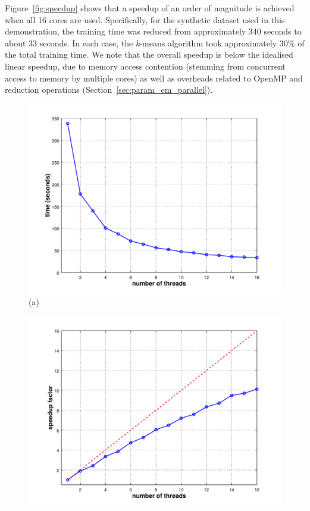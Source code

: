 Figure~\ref{fig:speedup} shows that a speedup of an order of magnitude is achieved when all 16 cores are used.
Specifically, for the synthetic dataset used in this demonstration,
the training time was reduced from approximately 340 seconds to about 33 seconds.
In each case, the {\it k}-means algorithm took approximately 30\% of the total training time.
We note that the overall speedup is below the idealised linear speedup,
due to memory access contention (stemming from concurrent access to memory by multiple cores)
as well as overheads related to OpenMP and reduction operations (Section~\ref{sec:param_em_parallel}).


\begin{figure}[!h]
\centering
\begin{minipage}{1\columnwidth}
  \centering
  \begin{minipage}{0.5\textwidth}
    \centering
    \includegraphics[width=1.1\textwidth]{plot1.pdf}\\
    {(a)}
  \end{minipage}%
  \begin{minipage}{0.5\textwidth}
    \centering
    \includegraphics[width=1.1\textwidth]{plot2.pdf}\\

\end{minipage}
\end{minipage}
\end{figure}
